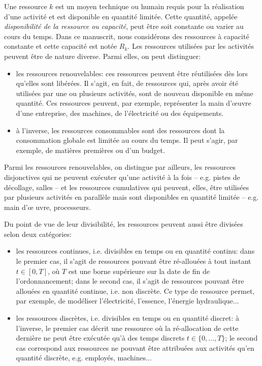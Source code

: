 Une ressource $k$ est un moyen technique ou humain requis pour la
réalisation d'une activité et est disponible en quantité
limitée. Cette quantité, appelée {\it disponibilité de la ressource ou
  capacité}, peut être soit constante ou varier au cours du
temps. Dans ce manuscrit, nous considérons des ressources à capacité
constante et cette capacité est notée $R_k$. Les ressources utilisées
par les activités peuvent être de nature diverse. Parmi elles, on peut
distinguer:
\begin{itemize}
\item les ressources renouvelables: ces ressources peuvent être
réutilisées dès lors qu'elles sont libérées. Il s'agit, en fait, de
ressources qui, après avoir été utilisées par une ou plusieurs
activités, sont de nouveau disponible en même quantité. Ces ressources
peuvent, par exemple, représenter la main d'\oe uvre d'une entreprise,
des machines, de l'électricité ou des équipements.
\item à l'inverse, les ressources consommables sont des ressources
dont la consommation globale est limitée au cours du temps. Il peut
s'agir, par exemple, de matières premières ou d'un budget.
\end{itemize}

Parmi les ressources renouvelables, on distingue par ailleurs, les
ressources disjonctives qui ne peuvent exécuter qu'une activité à la
fois -- e.g. pistes de décollage, salles -- et les ressources cumulatives
qui peuvent, elles,  être utilisées par plusieurs activités en
parallèle mais sont disponibles en quantité limitée -- e.g. main d'\oe
uvre,
processeurs.


Du point de vue de leur divisibilité, les ressources peuvent aussi
être divisées selon deux catégories: 
\begin{itemize}
\item les ressources continues, i.e. divisibles en temps ou en
  quantité continu: dans le premier cas, il s'agit de ressources
  pouvant être ré-allouées à tout instant $t \in [0,T]$, où $T$ est une
  borne supérieure sur la date de fin de l'ordonnancement; dans le
  second cas, il s'agit de ressources pouvant être allouées en quantité
  continue, i.e. non discrète. Ce type de ressource permet, par
  exemple, de modéliser l'électricité, l'essence, l'énergie hydraulique...
\item les ressources discrètes, i.e. divisibles en temps ou en quantité
  discret: à l'inverse, le premier cas décrit une ressource où la
  ré-allocation de cette dernière ne peut être 
  exécutée qu'à des temps discrets $t \in \{0,\dots,T\}$; le second
  cas correspond aux ressources ne pouvant être attribuées aux
  activités qu'en quantité discrète,  e.g. employés, machines...
\end{itemize}

